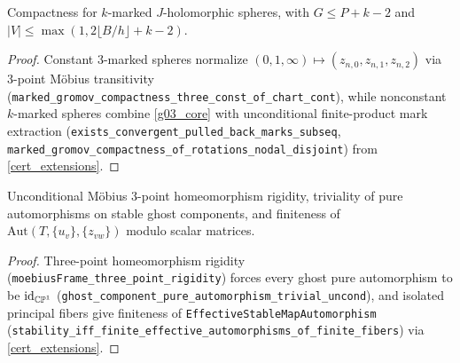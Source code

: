 \begin{theorem}
\label{e02_marked}
\leanok
{}
Compactness for $k$-marked $J$-holomorphic spheres, with $G\le P+k-2$ and $|V|\le\max(1,2\lfloor B/h\rfloor+k-2)$.
\end{theorem}
\begin{proof}\leanok Constant 3-marked spheres normalize $(0,1,\infty)\mapsto(z_{n,0},z_{n,1},z_{n,2})$ via 3-point M\"obius transitivity (\texttt{marked\_gromov\_compactness\_three\_const\_of\_chart\_cont}), while nonconstant $k$-marked spheres combine \cref{g03_core} with unconditional finite-product mark extraction (\texttt{exists\_convergent\_pulled\_back\_marks\_subseq}, \texttt{marked\_gromov\_compactness\_of\_rotations\_nodal\_disjoint}) from \cref{cert_extensions}.\end{proof}

\begin{theorem}[Automorphisms (E04)]
\label{e04_aut}
\leanok
{}
Unconditional M\"obius 3-point homeomorphism rigidity, triviality of pure automorphisms on stable ghost
components, and finiteness of $\mathrm{Aut}(T,\{u_v\},\{z_{vw}\})$ modulo scalar matrices.
\end{theorem}
\begin{proof}\leanok Three-point homeomorphism rigidity (\texttt{moebiusFrame\_three\_point\_rigidity}) forces every ghost pure automorphism to be $\mathrm{id}_{\mathbb{CP}^1}$ (\texttt{ghost\_component\_pure\_automorphism\_trivial\_uncond}), and isolated principal fibers give finiteness of \texttt{EffectiveStableMapAutomorphism} (\texttt{stability\_iff\_finite\_effective\_automorphisms\_of\_finite\_fibers}) via \cref{cert_extensions}.\end{proof}

